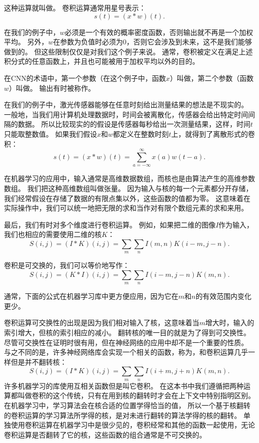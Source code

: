 这种运算就叫做。
卷积运算通常用星号表示：
\begin{equation}
s(t) = (x*w)(t).
\end{equation}

在我们的例子中，$w$必须是一个有效的概率密度函数，否则输出就不再是一个加权平均。
另外，$w$在参数为负值时必须为0，否则它会涉及到未来，这不是我们能够做到的。
但这些限制仅仅是对我们这个例子来说。
通常，卷积被定义在满足上述积分式的任意函数上，并且也可能被用于加权平均以外的目的。

在\gls{CNN}的术语中，第一个参数（在这个例子中，函数$x$）叫做，第二个参数（函数$w$）叫做。
输出有时被称作。

 
在我们的例子中，激光传感器能够在任意时刻给出测量结果的想法是不现实的。
一般地，当我们用计算机处理数据时，时间会被离散化，传感器会给出特定时间间隔的数据。
所以比较现实的的假设是传感器每秒给出一次测量结果，这样，时间$t$只能取整数值。
如果我们假设$x$和$w$都定义在整数时刻$t$上，就得到了离散形式的卷积：
\begin{equation}
s(t) = (x*w)(t) = \sum_{a = -\infty}^{\infty} x(a)w(t-a).
\end{equation}

在机器学习的应用中，输入通常是高维数据数组，而核也是由算法产生的高维参数数组。
我们把这种高维数组叫做张量。
因为输入与核的每一个元素都分开存储，我们经常假设在存储了数据的有限点集以外，这些函数的值都为零。
这意味着在实际操作中，我们可以统一地把无限的求和当作对有限个数组元素的求和来用。

最后，我们有时对多个维度进行卷积运算。
例如，如果把二维的图像$I$作为输入，我们也相应的需要使用二维的核$K$：
\begin{equation}
S(i,j) = (I*K)(i,j) = \sum_m \sum_n I(m,n) K(i-m, j-n).
\end{equation}

卷积是可交换的，我们可以等价地写作：
\begin{equation}
S(i, j) = (K*I)(i,j) = \sum_m \sum_n I(i-m, j-n) K(m, n).
\end{equation}

通常，下面的公式在机器学习库中更方便应用，因为它在$m$和$n$的有效范围内变化更少。%

 
卷积运算可交换性的出现是因为我们相对输入了核，这意味着当$m$增大时，输入的索引增大，但核的索引相应的减小。
翻转核的唯一目的就是为了得到可交换性。
尽管可交换性在证明时很有用，但在神经网络的应用中却不是一个重要的性质。
与之不同的是，许多神经网络库会实现一个相关的函数，称为，和卷积运算几乎一样但是并不翻转核：
\begin{equation}
S(i, j) = (I*K)(i, j) = \sum_m \sum_n I(i+m, j+n) K(m, n).
\end{equation}
许多机器学习的库使用互相关函数但是叫它卷积。
在这本书中我们遵循把两种运算都叫做卷积的这个传统，只有在用到核的翻转时才会在上下文中特别指明区别。
在机器学习中，学习算法会在核合适的位置学得恰当的值， 所以一个基于核翻转的卷积运算的学习算法所学得的核，是对未进行翻转的算法学得的核的翻转。
单独使用卷积运算在机器学习中是很少见的，卷积经常和其他的函数一起使用，无论卷积运算是否翻转了它的核，这些函数的组合通常是不可交换的。

